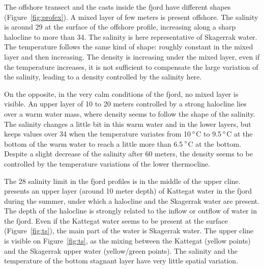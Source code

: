 \documentclass[12pt,a4paper]{article}
\begin{document}
The offshore transect and the casts inside the fjord have different shapes
(Figure~\ref{fig:profex}).
A mixed layer of few meters is present offshore.
The salinity is around 29 at the surface of the offshore profile, increasing
along a sharp halocline to more than 34. The salinity is here representative
of Skagerrak water.
The temperature follows the same kind of shape: roughly constant
in the mixed layer and then increasing.
The density is increasing under the mixed layer, even if the temperature
increases, it is not sufficient to compensate the large variation
of the salinity, leading to a density controlled by the salinity here.

On the opposite, in the very calm
conditions of the fjord, no mixed layer is visible.
An upper layer of 10 to 20 meters controlled by a strong halocline
lies over a warm water mass, where density seems to follow the shape of
the salinity. The salinity changes a little bit in this warm water and in the lower layers,
but keeps values over 34 when the temperature variates from 10\,$^{\circ}$C
to 9.5\,$^{\circ}$C at the bottom of the warm water to reach a little
more than 6.5\,$^{\circ}$C at the bottom.
Despite a slight decrease of the salinity after 60 meters, the density
seems to be controlled by the temperature variations of the lower thermocline.

The 28 salinity limit in the fjord profiles is in the middle
of the upper cline. \cite{arneborg2003} presents an upper layer (around 10 meter
depth) of Kattegat water in the fjord during the summer, under which a halocline
and the Skagerrak water are present. The depth of the halocline is strongly related
to the inflow or outflow of water in the fjord.
Even if the Kattegat water seems to be present at the surface (Figure~\ref{fig:ts}),
the main part of the water is Skagerrak water. The upper cline
is visible on Figure~\ref{fig:ts}, as the mixing between the Kattegat (yellow points)
and the Skagerrak upper water (yellow/green points).
The salinity and the temperature of the bottom stagnant layer
have very little spatial variation.
\end{document}
